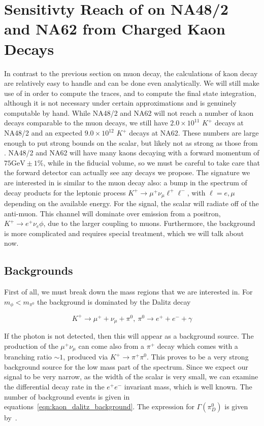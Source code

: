 \section{Sensitivty Reach of on NA48/2 and NA62 from Charged Kaon Decays}
In contrast to the previous section on muon decay, the calculations of kaon decay are relatively easy to handle and can be done even analytically.
We will still make use of \feyncalc in order to compute the traces, and \mathematica to compute the final state integration, although it is not necessary under certain approximations and is genuinely computable by hand.
While NA48/2 and NA62 will not reach a number of kaon decays comparable to the muon decays, we still have $2.0 \times 10^{11}$ $K^+$ decays at NA48/2 and an expected $9.0 \times 10^{12}$ $K^+$ decays at NA62.
These numbers are large enough to put strong bounds on the scalar, but likely not as strong as those from \mueee.
NA48/2 and NA62 will have many kaons decaying with a forward momentum of $75\textrm{GeV} \pm 1\%$, while in the fiducial volume, so we must be careful to take care that the forward detector can actually see any decays we propose.
The signature we are interested in is similar to the muon decay also: a bump in the spectrum of decay products for the leptonic process $K^+ \rightarrow \mu^+ \nu_\mu \ell^+ \ell^-$, with $\ell = e, \mu$ depending on the available energy.
For the signal, the scalar will radiate off of the anti-muon.
This channel will dominate over emission from a positron, $K^+ \rightarrow e^+ \nu_e \phi$, due to the larger coupling to muons.
Furthermore, the background is more complicated and requires special treatment, which we will talk about now.

\subsection{Backgrounds}
First of all, we must break down the mass regions that we are interested in.
For $m_\phi < m_{\pi^0}$ the background is dominated by the Dalitz decay

\begin{equation}
K^+ \rightarrow \mu^+ + \nu_\mu + \pi^0,~\pi^0 \rightarrow e^+ + e^- + \gamma
\end{equation}

\noindent If the photon is not detected, then this will appear as a background source.
The production of the $\mu^+ \nu_\mu$ can come also from a $\pi^+$ decay which comes with a branching ratio $\sim 1$, produced via $K^+ \rightarrow \pi^+ \pi^0$.
This proves to be a very strong background source for the low mass part of the spectrum.
Since we expect our signal to be very narrow, as the width of the scalar is very small, we can examine the differential decay rate in the $e^+ e^-$ invariant mass, which is well known.
The number of background events is given in equations~\ref{eqn:kaon_dalitz_background}.
The expression for $\Gamma(\pi^0_D)$ is given by~\cite{Mikaelian:1972yg}.

